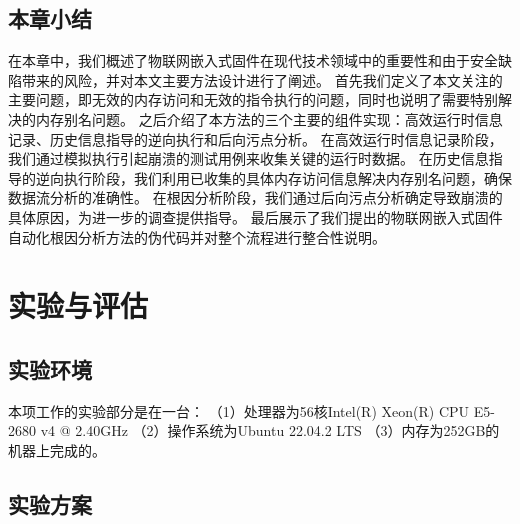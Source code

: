 \subsection{本章小结}                   %
在本章中，我们概述了物联网嵌入式固件在现代技术领域中的重要性和由于安全缺陷带来的风险，并对本文主要方法设计进行了阐述。
首先我们定义了本文关注的主要问题，即无效的内存访问和无效的指令执行的问题，同时也说明了需要特别解决的内存别名问题。
之后介绍了本方法的三个主要的组件实现：高效运行时信息记录、历史信息指导的逆向执行和后向污点分析。
在高效运行时信息记录阶段，我们通过模拟执行引起崩溃的测试用例来收集关键的运行时数据。
在历史信息指导的逆向执行阶段，我们利用已收集的具体内存访问信息解决内存别名问题，确保数据流分析的准确性。
在根因分析阶段，我们通过后向污点分析确定导致崩溃的具体原因，为进一步的调查提供指导。
最后展示了我们提出的物联网嵌入式固件自动化根因分析方法的伪代码并对整个流程进行整合性说明。






\cleardoublepage
\section{实验与评估}        %
\subsection{实验环境}
本项工作的实验部分是在一台：
（1）处理器为56核Intel(R) Xeon(R) CPU E5-2680 v4 @ 2.40GHz
（2）操作系统为Ubuntu 22.04.2 LTS
（3）内存为252GB的机器上完成的。
\subsection{实验方案}
